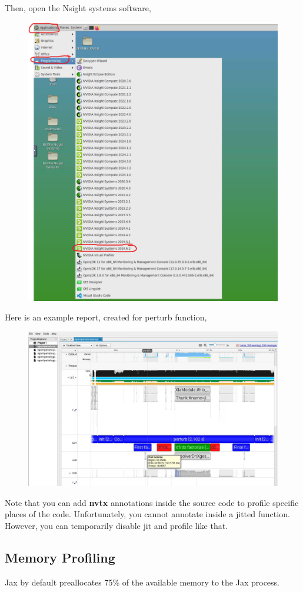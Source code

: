 Then, open the Nsight systems software,
\begin{figure}[H]
    \centering
    \includegraphics[width=0.5\linewidth]{figures/nsight-systems.png}
\end{figure}
Here is an example report, created for perturb function,

\begin{figure}[H]
    \centering
    \includegraphics[width=\linewidth]{figures/example-report.png}
\end{figure}

Note that you can add \textbf{nvtx} annotations inside the source code to profile specific places of the code. Unfortunately, you cannot annotate inside a jitted function. However, you can temporarily disable jit and profile like that.

\subsection{Memory Profiling}

Jax by default preallocates 75\% of the available memory to the Jax process.

